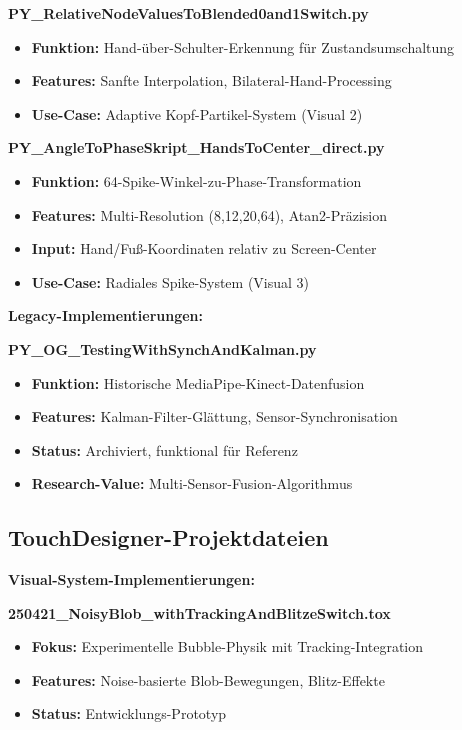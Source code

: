 \textbf{PY\_RelativeNodeValuesToBlended0and1Switch.py}
\begin{itemize}
    \item \textbf{Funktion:} Hand-über-Schulter-Erkennung für Zustandsumschaltung
    \item \textbf{Features:} Sanfte Interpolation, Bilateral-Hand-Processing
    \item \textbf{Use-Case:} Adaptive Kopf-Partikel-System (Visual 2)
\end{itemize}

\textbf{PY\_AngleToPhaseSkript\_HandsToCenter\_direct.py}
\begin{itemize}
    \item \textbf{Funktion:} 64-Spike-Winkel-zu-Phase-Transformation
    \item \textbf{Features:} Multi-Resolution (8,12,20,64), Atan2-Präzision
    \item \textbf{Input:} Hand/Fuß-Koordinaten relativ zu Screen-Center
    \item \textbf{Use-Case:} Radiales Spike-System (Visual 3)
\end{itemize}

\textbf{Legacy-Implementierungen:}

\textbf{PY\_OG\_TestingWithSynchAndKalman.py}
\begin{itemize}
    \item \textbf{Funktion:} Historische MediaPipe-Kinect-Datenfusion
    \item \textbf{Features:} Kalman-Filter-Glättung, Sensor-Synchronisation
    \item \textbf{Status:} Archiviert, funktional für Referenz
    \item \textbf{Research-Value:} Multi-Sensor-Fusion-Algorithmus
\end{itemize}

\subsection{TouchDesigner-Projektdateien}

\textbf{Visual-System-Implementierungen:}

\textbf{250421\_NoisyBlob\_withTrackingAndBlitzeSwitch.tox}
\begin{itemize}
    \item \textbf{Fokus:} Experimentelle Bubble-Physik mit Tracking-Integration
    \item \textbf{Features:} Noise-basierte Blob-Bewegungen, Blitz-Effekte
    \item \textbf{Status:} Entwicklungs-Prototyp
\end{itemize}

